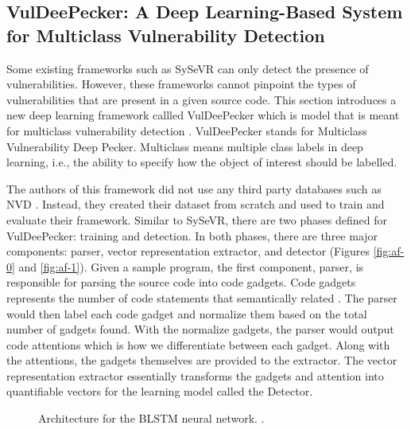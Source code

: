 \documentclass[12pt,twocolumn,letterpaper]{article}
\begin{document}
\subsection{VulDeePecker: A Deep Learning-Based System for Multiclass Vulnerability Detection}
\label{sub:vuledeepecker}

Some existing frameworks such as SySeVR can only detect the presence of vulnerabilities. However, these 
frameworks cannot pinpoint the types of vulnerabilities that are present in a given source code. This 
section introduces a new deep learning framework callled VulDeePecker which is model that is meant for 
multiclass vulnerability detection \cite{Zou21}.  VulDeePecker stands for Multiclass Vulnerability Deep Pecker.
Multiclass means multiple class labels in deep learning, i.e., the ability to specify how the object of interest 
should be labelled.

The authors of this framework did not use any third party databases such as NVD \cite{Nist00,Zou21}. Instead, 
they created their dataset from scratch and used to train and evaluate their framework. Similar to SySeVR, 
there are two phases defined for VulDeePecker: training and detection. In both phases, there are three major
components: parser, vector representation extractor, and detector (Figures \ref{fig:af-0} and \ref{fig:af-1}). 
Given a sample program, the first component, parser, is responsible for parsing the source code into code gadgets. 
Code gadgets represents the number of code statements that semantically related \cite{Zou21}. The parser would then 
label each code gadget and normalize them based on the total number of gadgets found. With the normalize gadgets, 
the parser would output code attentions which is how we differentiate between each gadget. Along with the attentions,
the gadgets themselves are provided to the extractor. The vector representation extractor essentially transforms the 
gadgets and attention into quantifiable vectors for the learning model called the Detector. 

\begin{figure}[h]
    \centering

    \caption{Architecture for the BLSTM neural network. \cite{Zou21}.}
    \label{fig:af-2}
\end{figure}
\end{document}
